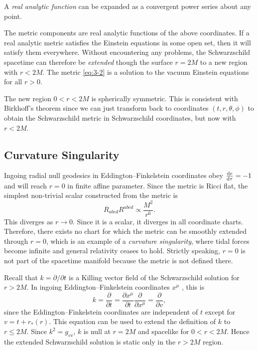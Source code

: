 \begin{definition}
  A \emph{real analytic function} can be expanded as a convergent power series about any point.
\end{definition}
The metric components are real analytic functions of the above coordinates.
If a real analytic metric satisfies the Einstein equations in some open set, then it will satisfy them everywhere.
Without encountering any problems, the Schwarzschild spacetime  can therefore be \emph{extended} though the surface $r = 2M$ to a new region with  $r < 2M$. 
The metric \eqref{eq:3-2} is a solution to the vacuum Einstein equations for all $r > 0$.
\begin{remark}
  The new region $0 < r < 2M$ is spherically symmetric. This is consistent with Birkhoff's theorem since we can just transform back to coordinates $(t, r, \theta, \phi)$ to obtain the Schwarzschild metric in Schwarzschild coordinates, but now with $r < 2M$.
\end{remark}

\subsection{Curvature Singularity}%
\label{sub:curvature_singularity}

Ingoing radial null geodesics in Eddington--Finkelstein coordinates obey $\dv{r}{\tau} = -1$ and will reach $r = 0$ in finite affine parameter.
Since the metric is Ricci flat, the simplest non-trivial scalar constructed from the metric is
\begin{equation}
  R_{abcd} R^{abcd} \propto \frac{M^2}{r^6}.
\end{equation}
This diverges as $r \to 0$.
Since it is a scalar, it diverges in all coordinate charts.
Therefore, there exists no chart for which the metric can be smoothly extended through  $r = 0$, which is an example of a \emph{curvature singularity}, where tidal forces become infinite and general relativity ceases to hold.
Strictly speaking, $r = 0$ is not part of the spacetime manifold because the metric is not defined there.

Recall  that  $k = \partial / \partial t$  is a Killing vector field of the Schwarzschild solution for $r > 2M$.
In ingoing Eddington--Finkelstein coordinates  $x^{\mu}$ , this is
\begin{equation}
  k  = \frac{\partial }{\partial t} = \frac{\partial x^{\mu}}{\partial t} \frac{\partial }{\partial x^{\mu}} = \frac{\partial }{\partial v},
\end{equation} 
since the Eddington--Finkelstein coordinates are independent of $t$ except for $v = t + r_*(r)$.
This equation can be used to extend the definition of $k$ to $r \leq 2M$.
Since $k^2 = g_{vv}$, $k$ is null at $r= 2M$ and spacelike for $ 0 < r < 2M$.
Hence the extended Schwarzschild solution is static only in the $r > 2M$ region.
